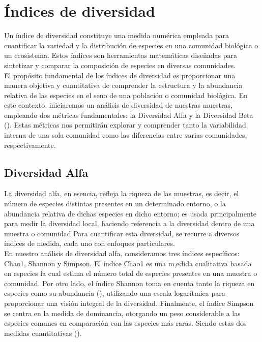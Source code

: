 \section{Índices de diversidad}

Un índice de diversidad constituye una medida numérica empleada para cuantificar la variedad y la distribución de especies en una comunidad biológica o un ecosistema. Estos índices son herramientas matemáticas diseñadas para sintetizar y comparar la composición de especies en diversas comunidades.\\

El propósito fundamental de los índices de diversidad es proporcionar una manera objetiva y cuantitativa de comprender la estructura y la abundancia relativa de las especies en el seno de una población o comunidad biológica. En este contexto, iniciaremos un análisis de diversidad de nuestras muestras, empleando dos métricas fundamentales: la Diversidad Alfa y la Diversidad Beta (\cite{tuomisto2010}). Estas métricas nos permitirán explorar y comprender tanto la variabilidad interna de una sola comunidad como las diferencias entre varias comunidades, respectivamente.\\ 


\subsection{Diversidad Alfa}

La diversidad alfa, en esencia, refleja la riqueza de las muestras, es decir, el número de especies distintas presentes en un determinado entorno, o la abundancia relativa de dichas especies en dicho entorno; es usada principalmente para medir la diversidad local, haciendo referencia a la diversidad dentro de una muestra o comunidad %
 Para cuantificar esta diversidad, se recurre a diversos índices de medida, cada uno con enfoques particulares.\\

En nuestro análisis de diversidad alfa, consideramos tres índices específicos: Chao1, Shannon y Simpson. El índice Chao1 es una m,edida cualitativa basada en especies
la cual estima el número total de especies presentes en una muestra o comunidad. Por otro lado, el índice Shannon toma en cuenta tanto la riqueza en especies como su abundancia (\cite{shannon1948}), utilizando una escala logarítmica para proporcionar una visión integral de la diversidad. Finalmente, el índice Simpson se centra en la medida de dominancia, otorgando un peso considerable a las especies comunes en comparación con las especies más raras. Siendo estas dos medidas cuantitativas (\cite{simpson1949}).\\

